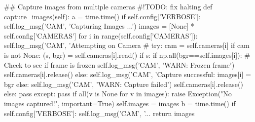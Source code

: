 \begin{python}
    ## Capture images from multiple cameras #!TODO: fix halting
    def capture_images(self):
        a = time.time()
        if self.config['VERBOSE']: self.log_msg('CAM', 'Capturing Images ...')
        images = [None] * self.config['CAMERAS']
        for i in range(self.config['CAMERAS']):
            self.log_msg('CAM', 'Attempting on Camera #%
            try:
                cam = self.cameras[i]
                if cam is not None:
                    (s, bgr) = self.cameras[i].read()
                    if s:
                        if np.all(bgr==self.images[i]): # Check to see if frame is frozen
                            self.log_msg('CAM', 'WARN: Frozen frame')
                            self.cameras[i].release()
                        else:
                            self.log_msg('CAM', 'Capture successful: %
                            images[i] = bgr
                    else:
                        self.log_msg('CAM', 'WARN: Capture failed')
                        self.cameras[i].release()
                else:
                    pass
            except:
                pass
        if all(v is None for v in images): raise Exception("No images captured!", important=True)
        self.images = images
        b = time.time()
        if self.config['VERBOSE']: self.log_msg('CAM', '... %
        return images


\end{python}
